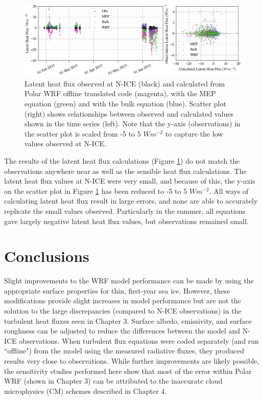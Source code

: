 \begin{figure}[t]
    \centering
    \includegraphics[width=1\linewidth]{figures/chapter6/latent_wrf.png}
    \caption[Latent heat flux observed at N-ICE and calculated from Polar WRF offline translated code.]{Latent heat flux observed at N-ICE (black) and calculated from Polar WRF offline translated code (magenta), with the MEP equation (green) and with the bulk equation (blue). Scatter plot (right) shows relationships between observed and calculated values shown in the time series (left). Note that the y-axis (observations) in the scatter plot is scaled from -5 to 5 $Wm^{-2}$ to capture the low values observed at N-ICE.}
    \label{fig:flux:latent}
\end{figure}

The results of the latent heat flux calculations (Figure \ref{fig:flux:latent}) do not match the observations anywhere near as well as the sensible heat flux calculations. The latent heat flux values at N-ICE were very small, and because of this, the y-axis on the scatter plot in Figure \ref{fig:flux:latent} has been reduced to -5 to 5 $Wm^{-2}$. All ways of calculating latent heat flux result in large errors, and none are able to accurately replicate the small values observed. Particularly in the summer, all equations gave largely negative latent heat flux values, but observations remained small.

\section{Conclusions}
Slight improvements to the WRF model performance can be made by using the appropriate surface properties for thin, first-year sea ice. However, these modifications provide slight increases in model performance but are not the solution to the large discrepancies (compared to N-ICE observations) in the turbulent heat fluxes seen in Chapter 3. Surface albedo, emissivity, and surface roughness can be adjusted to reduce the differences between the model and N-ICE observations. When turbulent flux equations were coded separately (and run ``offline") from the model using the measured radiative fluxes, they produced results very close to observations. While further improvements are likely possible, the sensitivity studies performed here show that most of the error within Polar WRF (shown in Chapter 3) can be attributed to the inaccurate cloud microphysics (CM) schemes described in Chapter 4. 

